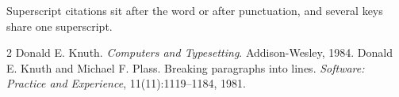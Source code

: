 \documentclass{article}
\begin{document}
Superscript citations sit after the word\cite{knuth84} or after
punctuation,\cite{plass81} and several keys\cite{knuth84,plass81} share one
superscript.

\begin{thebibliography}{2}
 Donald E. Knuth. \emph{Computers and Typesetting}. Addison-Wesley, 1984.
 Donald E. Knuth and Michael F. Plass. Breaking paragraphs
  into lines. \emph{Software: Practice and Experience}, 11(11):1119--1184, 1981.
\end{thebibliography}
\end{document}
